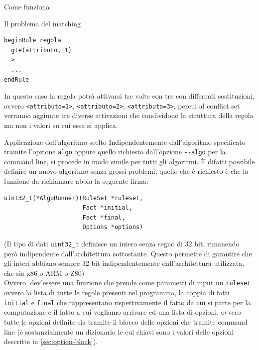 \begin{chapter}{Come funziona}
\begin{section}{Il problema del matching}
\begin{verbatim}
beginRule regola
  gte(attributo, 1)
  >
  ...
endRule
\end{verbatim}

In questo caso la regola potr\`a attivarsi tre volte con tre con differenti
sostituzioni, ovvero \verb,<attributo=1>,, \verb,<attributo=2>,, \verb,<attributo=3>,,
percui al conflict set verranno aggiunte tre diverse attivazioni che condividono la
struttura della regola ma non i valori su cui essa si applica.
\end{section}

\begin{section}{Applicazione dell'algoritmo scelto}
Indipendentemente dall'algoritmo specificato tramite l'opzione \verb,algo, oppure
quello richiesto dall'opzione \verb,--algo, per la command line, si procede in modo
simile per tutti gli algoritmi. \`E difatti possibile definire un nuovo algoritmo
senza grossi problemi, quello che \`e richiesto \`e che la funzione da richiamare
abbia la seguente firma:

\begin{verbatim}
uint32_t(*AlgoRunner)(RuleSet *ruleset,
                      Fact *initial,
                      Fact *final,
                      Options *options)
\end{verbatim}

\noindent (Il tipo di dati \verb,uint32_t, definisce un intero senza segno di 32 bit,
rimanendo per\`o indipendente dall'architettura sottostante. Questo permette di
garantire che gli interi abbiano sempre 32 bit indipendentemente dall'architettura
utilizzata, che sia x86 o ARM o Z80)\\

\noindent Ovvero, dev'essere una funzione che prende come parametri di input
un \verb,ruleset, ovvero la lista di tutte le regole presenti nel programma,
la coppia di fatti \verb,initial, e \verb,final, che rappresentano rispettivamente il
fatto da cui si parte per la computazione e il fatto a cui vogliamo arrivare ed una
lista di opzioni, ovvero tutte le opzioni definite sia tramite il blocco delle
opzioni che tramite command line (\`e sostanzialmente un dizionario le cui chiavi
sono i valori delle opzioni descritte in \ref{sec:option-block}).
\end{section}

\end{chapter}
